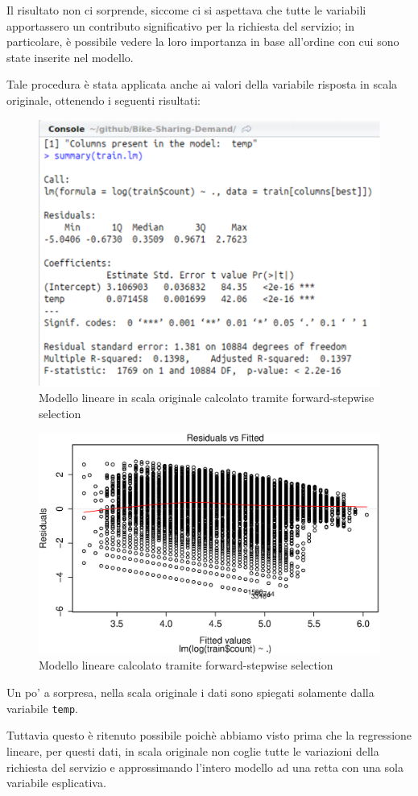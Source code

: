 Il risultato non ci sorprende, siccome ci si aspettava che tutte le variabili
apportassero un contributo significativo per la richiesta del servizio; in
particolare, è possibile vedere la loro importanza in base all'ordine con cui
sono state inserite nel modello.

Tale procedura è stata applicata anche ai valori della variabile risposta in
scala originale, ottenendo i seguenti risultati:

\begin{figure}[H]
  \centering
  \includegraphics[width=.55\columnwidth]{images/lm/fwd-sw-nolog.eps}
  \caption{Modello lineare in scala originale calcolato tramite
    forward-stepwise selection}
    \label{fig:lm-after-fwd-steps-nolog}
\end{figure}

\begin{figure}[H]
  \centering
  \includegraphics[width=.55\columnwidth]{images/lm/fwd-sw-nolog-residuals.eps}
  \caption{Modello lineare calcolato tramite forward-stepwise selection}
    \label{fig:fwd-sw-residuals}
\end{figure}

Un po' a sorpresa, nella scala originale i dati sono spiegati solamente dalla
variabile \texttt{temp}.

Tuttavia questo è ritenuto possibile poichè abbiamo visto prima che la
regressione lineare, per questi dati, in scala originale non coglie tutte le
variazioni della richiesta del servizio e approssimando l'intero modello ad
una retta con una sola variabile esplicativa.

